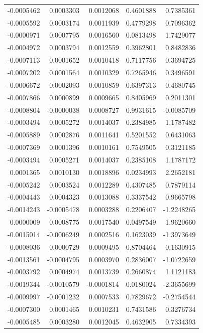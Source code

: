 \documentclass[]{tufte-handout}
\begin{document}
\begin{longtable}[]{@{}rrrrr@{}}
-0.0005462 & 0.0003303 & 0.0012068 & 0.4601888 & 0.7385361 \\
-0.0005592 & 0.0003174 & 0.0011939 & 0.4779298 & 0.7096362 \\
-0.0000971 & 0.0007795 & 0.0016560 & 0.0813498 & 1.7429077 \\
-0.0004972 & 0.0003794 & 0.0012559 & 0.3962801 & 0.8482836 \\
-0.0007113 & 0.0001652 & 0.0010418 & 0.7117756 & 0.3694725 \\
-0.0007202 & 0.0001564 & 0.0010329 & 0.7265946 & 0.3496591 \\
-0.0006672 & 0.0002093 & 0.0010859 & 0.6397313 & 0.4680745 \\
-0.0007866 & 0.0000899 & 0.0009665 & 0.8405969 & 0.2011301 \\
-0.0008804 & -0.0000038 & 0.0008727 & 0.9931615 & -0.0085709 \\
-0.0003494 & 0.0005272 & 0.0014037 & 0.2384985 & 1.1787482 \\
-0.0005889 & 0.0002876 & 0.0011641 & 0.5201552 & 0.6431063 \\
-0.0007369 & 0.0001396 & 0.0010161 & 0.7549505 & 0.3121185 \\
-0.0003494 & 0.0005271 & 0.0014037 & 0.2385108 & 1.1787172 \\
0.0001365 & 0.0010130 & 0.0018896 & 0.0234993 & 2.2652181 \\
-0.0005242 & 0.0003524 & 0.0012289 & 0.4307485 & 0.7879114 \\
-0.0004443 & 0.0004323 & 0.0013088 & 0.3337542 & 0.9665798 \\
-0.0014243 & -0.0005478 & 0.0003288 & 0.2206407 & -1.2248265 \\
0.0000009 & 0.0008775 & 0.0017540 & 0.0497549 & 1.9620660 \\
-0.0015014 & -0.0006249 & 0.0002516 & 0.1623039 & -1.3973649 \\
-0.0008036 & 0.0000729 & 0.0009495 & 0.8704464 & 0.1630915 \\
-0.0013561 & -0.0004795 & 0.0003970 & 0.2836007 & -1.0722659 \\
-0.0003792 & 0.0004974 & 0.0013739 & 0.2660874 & 1.1121183 \\
-0.0019344 & -0.0010579 & -0.0001814 & 0.0180024 & -2.3655699 \\
-0.0009997 & -0.0001232 & 0.0007533 & 0.7829672 & -0.2754544 \\
-0.0007300 & 0.0001465 & 0.0010231 & 0.7431586 & 0.3276734 \\
-0.0005485 & 0.0003280 & 0.0012045 & 0.4632905 & 0.7334393 \\

\end{longtable}
\end{document}
